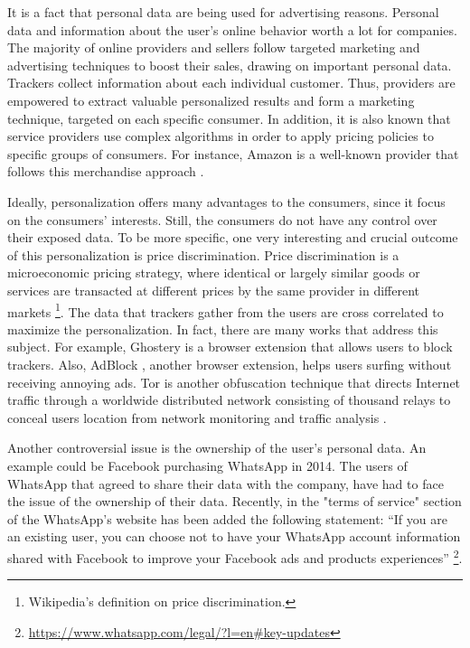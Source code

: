It is a fact that personal data are being used for advertising reasons.
Personal data and information about the user's online behavior worth a lot for
companies. The majority of online providers and sellers follow targeted
marketing and advertising  techniques to boost their sales, drawing on
important personal data. Trackers collect information about each individual
customer. Thus, providers are empowered to extract valuable personalized results
and form a marketing technique, targeted on each specific consumer.
In addition, it is also known that service providers use complex algorithms
in order to apply pricing policies to specific groups of consumers.
For instance, Amazon is a well-known provider that follows this merchandise
approach \cite{chen2016empirical}.

Ideally, personalization offers many advantages to the consumers, since it focus
on the consumers' interests. Still, the consumers do not have any control over
their exposed data. To be more specific, one very interesting and crucial
outcome of this personalization is price discrimination. Price discrimination is
a microeconomic pricing strategy, where identical or largely similar goods or
services are transacted at different prices by the same provider in different
markets \footnote{Wikipedia's definition on price discrimination.}.
The data that trackers gather from the users are cross correlated to maximize
the personalization. In fact, there are many works that address this subject.
For example, Ghostery \cite{ghostery} is a browser extension that allows users
to block trackers. Also, AdBlock \cite{adblock}, another browser extension,
helps users surfing without receiving annoying ads. Tor \cite{syverson2004tor}
is another obfuscation technique that directs Internet traffic through a
worldwide distributed network consisting of thousand relays to conceal users
location from network monitoring and traffic analysis \cite{clement2014nsa, 936, 
datr, ads}.

Another controversial issue is the ownership of the user's personal data.
An example could be Facebook purchasing WhatsApp in 2014. The users of WhatsApp 
that agreed to share their data with the company, have had to face the issue of 
the ownership of their data. Recently, in the "terms of service" section of the 
WhatsApp's website has been added the following statement: ``If you are an 
existing user, you can choose not to have your WhatsApp account information 
shared with Facebook to improve your Facebook ads and products experiences'' 
\footnote{\url{https://www.whatsapp.com/legal/?l=en\#key-updates}}.

